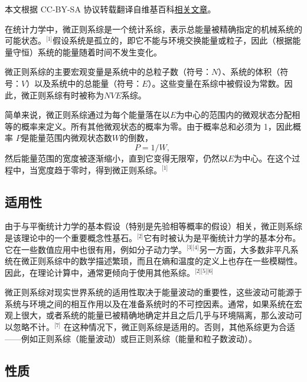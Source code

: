 
本文根据 CC-BY-SA 协议转载翻译自维基百科\href{https://en.wikipedia.org/wiki/Microcanonical_ensemble}{相关文章}。

在统计力学中，微正则系综是一个统计系综，表示总能量被精确指定的机械系统的可能状态。\(^\text{[1]}\)假设系统是孤立的，即它不能与环境交换能量或粒子，因此（根据能量守恒）系统的能量随着时间不发生变化。

微正则系综的主要宏观变量是系统中的总粒子数（符号：\( N \)）、系统的体积（符号：\( V \)）以及系统中的总能量（符号：\( E \)）。这些变量在系综中被假设为常数。因此，微正则系综有时被称为\(NVE\)系综。

简单来说，微正则系综通过为每个能量落在以\( E \)为中心的范围内的微观状态分配相等的概率来定义。所有其他微观状态的概率为零。由于概率总和必须为 1，因此概率 \( P \)是能量范围内微观状态数\( W \)的倒数，
\[
P = 1/W,~
\]
然后能量范围的宽度被逐渐缩小，直到它变得无限窄，仍然以\( E \)为中心。在这个过程中，当宽度趋于零时，得到微正则系综。\(^\text{[1]}\)
\subsection{适用性}  
由于与平衡统计力学的基本假设（特别是先验相等概率的假设）相关，微正则系综是该理论中的一个重要概念性基石。\(^\text{[2]}\)它有时被认为是平衡统计力学的基本分布。它在一些数值应用中也很有用，例如分子动力学。\(^\text{[3][4]}\)另一方面，大多数非平凡系统在微正则系综中的数学描述繁琐，而且在熵和温度的定义上也存在一些模糊性。因此，在理论计算中，通常更倾向于使用其他系综。\(^\text{[2][5][6]}\)

微正则系综对现实世界系统的适用性取决于能量波动的重要性，这些波动可能源于系统与环境之间的相互作用以及在准备系统时的不可控因素。通常，如果系统在宏观上很大，或者系统的能量已被精确地确定并且之后几乎与环境隔离，那么波动可以忽略不计。\(^\text{[7]}\) 在这种情况下，微正则系综是适用的。否则，其他系综更为合适——例如正则系综（能量波动）或巨正则系综（能量和粒子数波动）。
\subsection{性质}  
